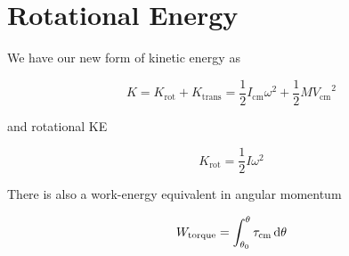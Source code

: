 \section{Rotational Energy}

\begin{definition}
	We have our new form of kinetic energy as

	\begin{equation}
		K = K_\mathrm{rot} + K_\mathrm{trans} = \frac{1}{2} I_\mathrm{cm} \omega^2 + \frac{1}{2} M {V_\mathrm{cm}}^2
	\end{equation}

	and rotational KE

	\begin{equation}
		K_\mathrm{rot} = \frac{1}{2} I \omega^2
	\end{equation}
\end{definition}

There is also a work-energy equivalent in angular momentum

\begin{equation}
	W_\mathrm{torque} = \int_{\theta_0}^\theta \tau_\mathrm{cm} \D \theta
\end{equation}